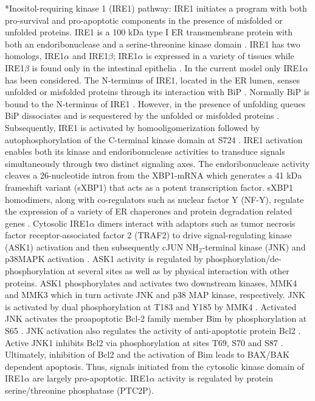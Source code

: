 \documentclass[12pt]{article}
\makeatletter
\renewcommand\subsection{\@startsection
	{subsection}{2}{0mm}
	{-0.05in}
	{-0.5\baselineskip}
	{\normalfont\normalsize\bfseries}}
\makeatother
\begin{document}
\subsection*{Inositol-requiring kinase 1 (IRE1) pathway:}
IRE1 initiates a program with both pro-survival and pro-apoptotic components in the presence of misfolded or unfolded proteins. IRE1 is a 100 kDa type I ER transmembrane protein with both an endoribonuclease and a serine-threonine kinase domain \citep{kaufman2002unfolded}. IRE1 has two homologs, IRE1$\alpha$ and IRE1$\beta$; IRE1$\alpha$ is expressed in a variety of tissues \citep{tirasophon1998srp} while IRE1$\beta$ is found only in the intestinal epithelia \citep{tirasophon1998srp,wang1998cmi}. In the current model only IRE1$\alpha$ has been considered. The N-terminus of IRE1, located in the ER lumen, senses unfolded or misfolded proteins through its interaction with BiP \citep{cox1993tig,shamu1996oap,sidrauski1997tki}. Normally BiP is bound to the N-terminus of IRE1 \citep{bertolotti2000dib,okamura2000dkb,liu2003sai}. However, in the presence of unfolding queues BiP dissociates and is sequestered by the unfolded or misfolded proteins \citep{kimata2003ger}. Subsequently, IRE1 is activated by homooligomerization followed by autophosphorylation of the C-terminal kinase domain at S724 \citep{shamu1996oap,welihinda1996unfolded,weiss1998sso,papa2003bka}. IRE1 activation enables both its kinase and endoribonuclease activities to transduce signals simultaneously through two distinct signaling axes. The endoribonuclease activity cleaves a 26-nucleotide intron from the XBP1-mRNA \citep{shen2001csp,yoshida2001xmi,lee2002imu} which generates a 41 kDa frameshift variant (sXBP1) that acts as a potent transcription factor. sXBP1 homodimers, along with co-regulators such as nuclear factor Y (NF-Y), regulate the expression of a variety of ER chaperones and protein degradation related genes \citep{malhotra2007era,rao2004mpe}. Cytosolic IRE1$\alpha$ dimers interact with adaptors such as tumor necrosis factor receptor-associated factor 2 (TRAF2) to drive signal-regulating kinase (ASK1) activation and then subsequently cJUN NH$_{2}$-terminal kinase (JNK) and p38MAPK activation \citep{Urano:2000uq}. ASK1 activity is regulated by phosphorylation/de-phosphorylation at several sites as well as by physical interaction with other proteins. ASK1 phosphorylates and activates two downstream kinases, MMK4 and MMK3 which in turn activate JNK and p38 MAP kinase, respectively. JNK is activated by dual phosphorylation at T183 and Y185 by MMK4 \citep{Derijard:1995fk}. Activated JNK activates the proapoptotic Bcl-2 family member Bim by phosphorylation at S65 \citep{lei2003jpb,putcha2003jmb}. JNK activation also regulates the activity of anti-apoptotic protein Bcl2 \citep{yamamoto1999bpa, Wei:2008hc}. Active JNK1 inhibits Bcl2 via phosphorylation at sites T69, S70 and S87 \citep{Wei:2008hc}. Ultimately, inhibition of Bcl2 and the activation of Bim leads to BAX/BAK dependent apoptosis. Thus, signals initiated from the cytosolic kinase domain of IRE1$\alpha$ are largely pro-apoptotic. IRE1$\alpha$ activity is regulated by protein serine/threonine phosphatase (PTC2P).
\end{document}

